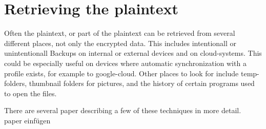 \section{Retrieving the plaintext}
Often the plaintext, or part of the plaintext can be retrieved from several different places, not only
the encrypted data. This includes intentionall or unintentionall Backups
on internal or external devices and on cloud-systems. 
This could be especially useful on devices where automatic synchronization with
a profile exists, for example to google-cloud.
Other places to look for include temp-folders, thumbnail folders for pictures, and
the history of certain programs used to open the files.

There are several paper describing a few of these techniques in more detail.
\\paper einfügen
